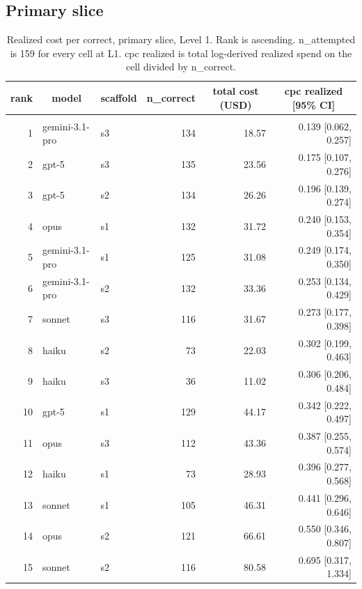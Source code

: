 \documentclass[10pt]{article} %
\begin{document}
    \subsection{Primary slice}\label{app:cpc_primary}

        \begin{table}[t]
            \caption{Realized cost per correct, primary slice, Level 1. Rank is ascending. n\_attempted is 159 for every cell at L1. cpc realized is total log-derived realized spend on the cell divided by n\_correct.}
        \label{tab:cpc_primary_L1_ranked}
        \begin{center}
        \small
        \begin{tabular}{rllrrr}
            \multicolumn{1}{c}{\bf rank} & \multicolumn{1}{c}{\bf model} & \multicolumn{1}{c}{\bf scaffold} & \multicolumn{1}{c}{\bf n\_correct} & \multicolumn{1}{c}{\bf total cost (USD)} & \multicolumn{1}{c}{\bf cpc realized [95\% CI]} \\
            \hline \\
            1 & gemini-3.1-pro & s3 & 134 & 18.57 & 0.139 [0.062, 0.257] \\
            2 & gpt-5 & s3 & 135 & 23.56 & 0.175 [0.107, 0.276] \\
            3 & gpt-5 & s2 & 134 & 26.26 & 0.196 [0.139, 0.274] \\
            4 & opus & s1 & 132 & 31.72 & 0.240 [0.153, 0.354] \\
            5 & gemini-3.1-pro & s1 & 125 & 31.08 & 0.249 [0.174, 0.350] \\
            6 & gemini-3.1-pro & s2 & 132 & 33.36 & 0.253 [0.134, 0.429] \\
            7 & sonnet & s3 & 116 & 31.67 & 0.273 [0.177, 0.398] \\
            8 & haiku & s2 & 73 & 22.03 & 0.302 [0.199, 0.463] \\
            9 & haiku & s3 & 36 & 11.02 & 0.306 [0.206, 0.484] \\
            10 & gpt-5 & s1 & 129 & 44.17 & 0.342 [0.222, 0.497] \\
            11 & opus & s3 & 112 & 43.36 & 0.387 [0.255, 0.574] \\
            12 & haiku & s1 & 73 & 28.93 & 0.396 [0.277, 0.568] \\
            13 & sonnet & s1 & 105 & 46.31 & 0.441 [0.296, 0.646] \\
            14 & opus & s2 & 121 & 66.61 & 0.550 [0.346, 0.807] \\
            15 & sonnet & s2 & 116 & 80.58 & 0.695 [0.317, 1.334] \\
        \end{tabular}
        \end{center}
        \end{table}
        
\end{document}
